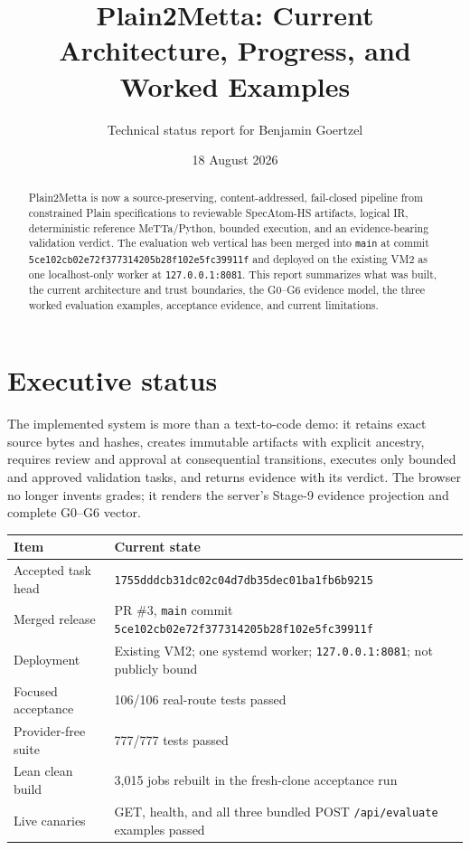 \documentclass[11pt]{article}
\title{Plain2Metta: Current Architecture, Progress, and Worked Examples}
\author{Technical status report for Benjamin Goertzel}
\date{18 August 2026}
\newcommand{\code}[1]{\texttt{#1}}
\begin{document}
\maketitle

\begin{abstract}
Plain2Metta is now a source-preserving, content-addressed, fail-closed pipeline
from constrained Plain specifications to reviewable SpecAtom-HS artifacts,
logical IR, deterministic reference MeTTa/Python, bounded execution, and an
evidence-bearing validation verdict.  The evaluation web vertical has been
merged into \code{main} at commit
\code{5ce102cb02e72f377314205b28f102e5fc39911f} and deployed on the existing
VM2 as one localhost-only worker at \code{127.0.0.1:8081}.  This report
summarizes what was built, the current architecture and trust boundaries, the
G0--G6 evidence model, the three worked evaluation examples, acceptance
evidence, and current limitations.
\end{abstract}

\section{Executive status}

The implemented system is more than a text-to-code demo: it retains exact
source bytes and hashes, creates immutable artifacts with explicit ancestry,
requires review and approval at consequential transitions, executes only
bounded and approved validation tasks, and returns evidence with its verdict.
The browser no longer invents grades; it renders the server's Stage-9 evidence
projection and complete G0--G6 vector.

\begin{tabularx}{\textwidth}{@{}lX@{}}
\toprule
Item & Current state \\
\midrule
Accepted task head & \code{1755dddcb31dc02c04d7db35dec01ba1fb6b9215} \\
Merged release & PR \#3, \code{main} commit \code{5ce102cb02e72f377314205b28f102e5fc39911f} \\
Deployment & Existing VM2; one systemd worker; \code{127.0.0.1:8081}; not publicly bound \\
Focused acceptance & 106/106 real-route tests passed \\
Provider-free suite & 777/777 tests passed \\
Lean clean build & 3,015 jobs rebuilt in the fresh-clone acceptance run \\
Live canaries & GET, health, and all three bundled POST \code{/api/evaluate} examples passed \\
\bottomrule
\end{tabularx}
\end{document}
